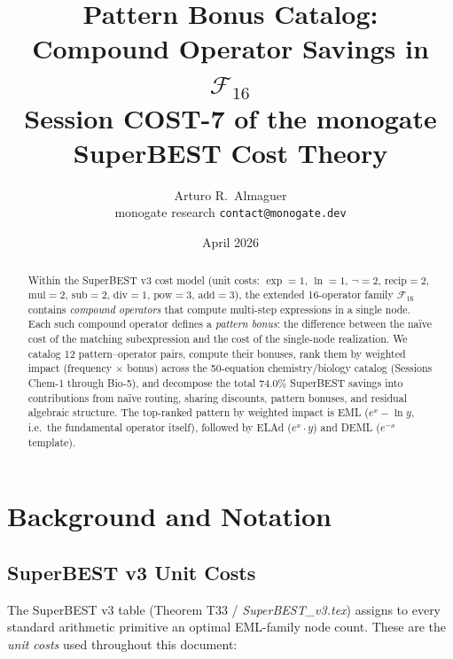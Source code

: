 \documentclass[12pt,a4paper]{article}
\title{Pattern Bonus Catalog:\\
       Compound Operator Savings in $\mathcal{F}_{16}$\\[6pt]
       \large Session COST-7 of the monogate SuperBEST Cost Theory}
\author{Arturo R.\ Almaguer\\
\small monogate research \quad \texttt{contact@monogate.dev}}
\date{April 2026}
\theoremstyle{definition}
\begin{document}
\maketitle

\begin{abstract}
Within the SuperBEST v3 cost model (unit costs: $\exp=1$, $\ln=1$, $\neg=2$,
$\mathrm{recip}=2$, $\mathrm{mul}=2$, $\mathrm{sub}=2$, $\mathrm{div}=1$,
$\mathrm{pow}=3$, $\mathrm{add}=3$), the extended 16-operator family
$\mathcal{F}_{16}$ contains \emph{compound operators} that compute
multi-step expressions in a single node.
Each such compound operator defines a \emph{pattern bonus}: the difference
between the na\"{i}ve cost of the matching subexpression and the cost of
the single-node realization.
We catalog 12 pattern--operator pairs, compute their bonuses, rank them by
weighted impact (frequency $\times$ bonus) across the 50-equation
chemistry/biology catalog (Sessions Chem-1 through Bio-5), and decompose
the total 74.0\% SuperBEST savings into contributions from na\"{i}ve
routing, sharing discounts, pattern bonuses, and residual algebraic
structure.
The top-ranked pattern by weighted impact is \textsf{EML} ($e^x - \ln y$,
i.e.\ the fundamental operator itself), followed by \textsf{ELAd} ($e^x
\cdot y$) and \textsf{DEML} ($e^{-x}$ template).
\end{abstract}

\tableofcontents
\bigskip

\section{Background and Notation}
\label{sec:background}

\subsection{SuperBEST v3 Unit Costs}

The SuperBEST v3 table (Theorem T33 / \textit{SuperBEST\_v3.tex}) assigns
to every standard arithmetic primitive an optimal EML-family node count.
These are the \emph{unit costs} used throughout this document:
\end{document}

